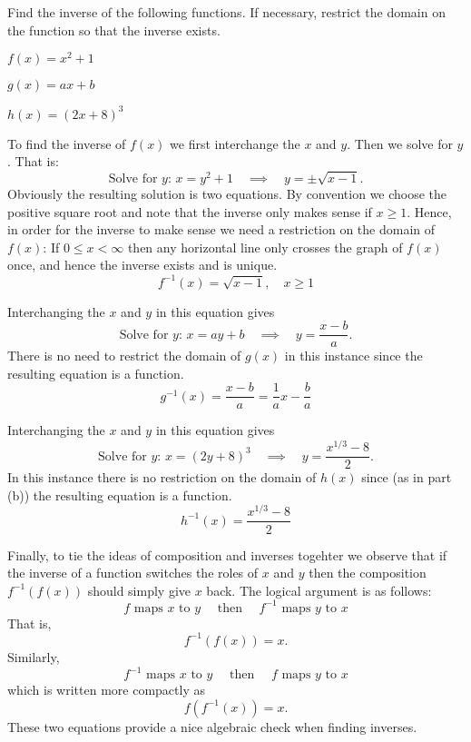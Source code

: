 \bex
Find the inverse of the following functions.  If necessary, restrict the domain on the
function so that the inverse exists.
\ba
    \item $f(x) = x^2+1$
    \item $g(x) = ax+b$
    \item $h(x) = (2x+8)^3$
\ea
\eex
\ba
    \item To find the inverse of $f(x)$ we first interchange the $x$ and $y$.  Then we
        solve for $y$.  That is:
        \[ \text{Solve for $y$: } x = y^2+1 \quad \implies \quad y = \pm\sqrt{x-1}. \]
        Obviously the resulting solution is two equations.  By convention we choose the
        positive square root and note that the inverse only makes sense if $x\ge 1$.
        Hence, in order for the inverse to make sense we need a restriction on the domain
        of $f(x)$: If $0 \le x < \infty$ then any horizontal line only crosses the  graph
        of $f(x)$ once, and hence the inverse exists and is unique.
        \[ f^{-1}(x) = \sqrt{x-1}, \quad x \ge 1 \]
    \item Interchanging the $x$ and $y$ in this equation gives
        \[ \text{Solve for $y$: } x = ay+b \quad \implies \quad y = \frac{x-b}{a}. \]
        There is no need to restrict the domain of $g(x)$ in this instance since the
        resulting equation is a function.
        \[ g^{-1}(x) = \frac{x-b}{a} = \frac{1}{a} x - \frac{b}{a} \]
    \item Interchanging the $x$ and $y$ in this equation gives
        \[ \text{Solve for $y$: } x = (2y+8)^3 \quad \implies \quad y = \frac{x^{1/3}-8}{2}. \]
        In this instance there is no restriction on the domain of $h(x)$ since (as in part
        (b)) the resulting equation is a function.
        \[ h^{-1}(x) = \frac{x^{1/3}-8}{2} \]
\ea
\afterex

Finally, to tie the ideas of composition and inverses togehter we observe that if the
inverse of a function switches the roles of $x$ and $y$ then the composition
$f^{-1}(f(x))$ should simply give $x$ back.  The logical argument is as follows: 
\[ f \text{ maps } x \text{ to } y \quad \text{ then } \quad f^{-1} \text{ maps } y \text{ to }
    x \]
That is,
\[ f^{-1}(f(x)) = x. \]
Similarly, 
\[ f^{-1} \text{ maps } x \text{ to } y \quad \text{ then } \quad f \text{ maps } y \text{ to }
    x \]
which is written more compactly as
\[ f(f^{-1}(x)) = x. \]
These two equations provide a nice algebraic check when finding inverses.



